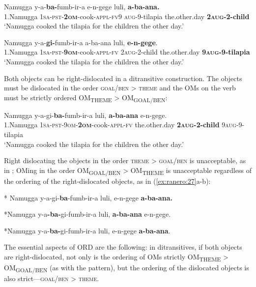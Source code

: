 \documentclass[output=paper
,newtxmath
,modfonts
,nonflat]{langsci/langscibook}
\begin{document}
\ea    \label{ex:ranero:23}
\gll Namugga    y-a-\textbf{ba-}fumb-ir-a                     e-n-gege         luli,            \textbf{a-ba-ana.}\\
1.Namugga \textsc{1sa-pst-}\textbf{\textsc{2om}}{}-cook-\textsc{appl-fv}9 \textsc{aug}{}-9-tilapia the.other.day \textbf{2\textsc{aug}}\textbf{{}-2-child}\\
\glt ‘Namugga cooked the tilapia for the children the other day.’
\z

\ea\label{ex:ranero:24}
\gll Namugga    y-a-\textbf{gi-}fumb-ir-a        a-ba-ana        luli,    \textbf{e-n-gege}.\\
1.Namugga \textsc{1sa-pst-}\textbf{\textsc{9om}}{}-cook-\textsc{appl-fv} 2\textsc{aug}{}-2-child the.other.day \textbf{9\textsc{aug}}\textbf{{}-9-tilapia}\\
\glt ‘Namugga cooked the tilapia for the children the other day.’
\z

Both objects can be right-dislocated in a ditransitive construction. The objects must be dislocated in the order \textsc{goal/ben > theme} and the OMs on the verb must be strictly ordered OM\textsubscript{THEME} > OM\textsubscript{GOAL/BEN}:


\ea\label{ex:ranero:25}
\gll Namugga     y-a-gi{}-\textbf{ba-}fumb-ir-a                     luli,                \textbf{a-ba-ana}      e-n-gege.\\
1.Namugga \textsc{1sa-pst-9om}\textsc{{}-}\textbf{\textsc{2om}}{}-cook-\textsc{appl-fv} the.other.day \textbf{2\textsc{aug}}\textbf{{}-2-child} 9\textsc{aug}{}-9-tilapia\\
\glt ‘Namugga cooked the tilapia for the children the other day.’
\z

Right dislocating the objects in the order \textsc{theme > goal/ben} is unacceptable, as in ; OMing in the order OM\textsubscript{GOAL/BEN} > OM\textsubscript{THEME} is unacceptable regardless of the ordering of the right-dislocated objects, as in (\ref{ex:ranero:27}a-b):

\ea\label{ex:ranero:26}
* Namugga y-a-gi{}-\textbf{ba}{}-fumb-ir-a luli, e-n-gege \textbf{a-ba-ana.}
\z

\ea\label{ex:ranero:27}
\ea\label{ex:ranero:27a}

*Namugga y-a\textbf{{}-ba-}gi{}-fumb-ir-a luli, \textbf{a-ba-ana} e-n-gege.

\ex\label{ex:ranero:27b}
*Namugga y-a-\textbf{ba-}gi{}-fumb-ir-a luli, e-n-gege \textbf{a-ba-ana}.
\z
\z

The essential aspects of ORD are the following: in ditransitives, if both objects are right-dislocated, not only is the ordering of OMs strictly OM\textsubscript{THEME} > OM\textsubscript{GOAL/BEN} (as with the  pattern), but the ordering of the dislocated objects is also strict—\textsc{goal/ben > theme}. 
\end{document}
